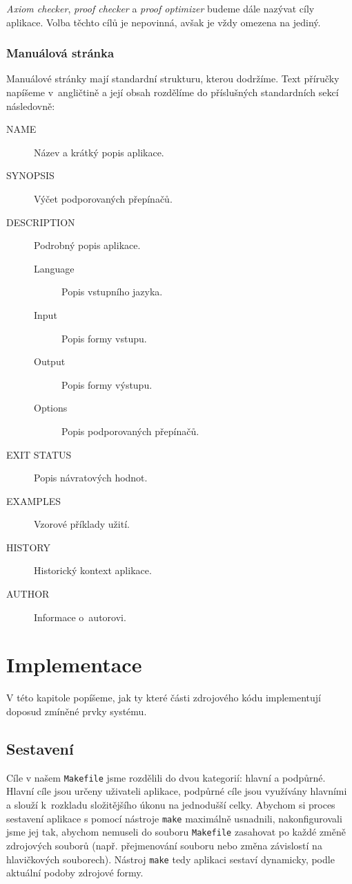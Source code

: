 \documentclass[thesis=B,czech,hidelinks]{thesis}[2012/06/26]
\begin{document}
\emph{Axiom checker}, \emph{proof checker} a \emph{proof optimizer} budeme dále nazývat cíly aplikace. Volba těchto cílů je nepovinná, avšak je vždy omezena na jediný.

\subsection{Manuálová stránka}

Manuálové stránky mají standardní strukturu, kterou dodržíme. Text příručky napíšeme v~angličtině a její obsah rozdělíme do příslušných standardních sekcí následovně:

\begin{description}
	\item[NAME]  Název a krátký popis aplikace.
	\item[SYNOPSIS] Výčet podporovaných přepínačů.
	\item[DESCRIPTION] Podrobný popis aplikace.
	\begin{description}
		\item[Language] Popis vstupního jazyka.
		\item[Input] Popis formy vstupu.
		\item[Output] Popis formy výstupu.
		\item[Options] Popis podporovaných přepínačů.
	\end{description}
	\item[EXIT STATUS] Popis návratových hodnot.
	\item[EXAMPLES] Vzorové příklady užití.
	\item[HISTORY] Historický kontext aplikace.
	\item[AUTHOR] Informace o~autorovi.
\end{description}

%
%
%

\chapter{Implementace}

V této kapitole popíšeme, jak ty které části zdrojového kódu implementují doposud zmíněné prvky systému.

\section{Sestavení}

Cíle v našem \texttt{Makefile} jsme rozdělili do dvou kategorií: hlavní a podpůrné. Hlavní cíle jsou určeny uživateli aplikace, podpůrné cíle jsou využívány hlavními a slouží k~rozkladu složitějšího úkonu na jednodušší celky. Abychom si proces sestavení aplikace s pomocí nástroje \texttt{make} maximálně usnadnili, nakonfigurovali jsme jej tak, abychom nemuseli do souboru \texttt{Makefile} zasahovat po každé změně zdrojových souborů (např. přejmenování souboru nebo změna závislostí na hlavičkových souborech). Nástroj \texttt{make} tedy aplikaci sestaví dynamicky, podle aktuální podoby zdrojové formy.
\end{document}
